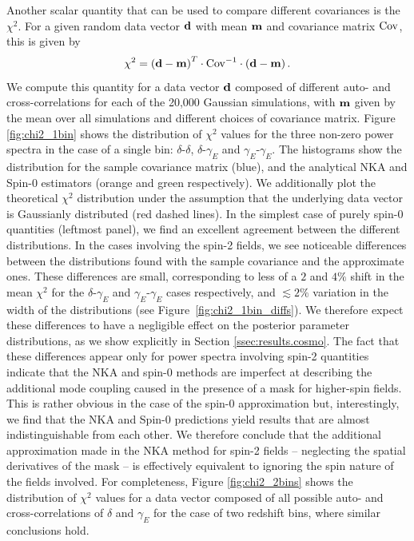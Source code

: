 \documentclass[a4paper,11pt]{article}
\begin{document}
      Another scalar quantity that can be used to compare different covariances is the $\chi^2$. For a given random data vector ${\bf d}$ with mean ${\bf m}$ and covariance matrix ${\rm Cov}$, this is given by
      \begin{equation}
        \chi^2=\left({\bf d}-{\bf m}\right)^T\cdot{\rm Cov}^{-1}\cdot\left({\bf d}-{\bf m}\right).
      \end{equation}
      We compute this quantity for a data vector ${\bf d}$ composed of different auto- and cross-correlations for each of the 20,000 Gaussian simulations, with ${\bf m}$ given by the mean over all simulations and different choices of covariance matrix. Figure \ref{fig:chi2_1bin} shows the distribution of $\chi^2$ values for the three non-zero power spectra in the case of a single bin: $\delta$-$\delta$, $\delta$-$\gamma_E$ and $\gamma_E$-$\gamma_E$. The histograms show the distribution for the sample covariance matrix (blue), and the analytical NKA and Spin-0 estimators (orange and green respectively). We additionally plot the theoretical $\chi^2$ distribution under the assumption that the underlying data vector is Gaussianly distributed (red dashed lines). In the simplest case of purely spin-0 quantities (leftmost panel), we find an excellent agreement between the different distributions. In the cases involving the spin-2 fields, we see noticeable differences between the distributions found with the sample covariance and the approximate ones.
      These differences are small, corresponding to less of a $2$ and $4\%$
      shift in the mean $\chi^2$ for the $\delta$-$\gamma_E$ and
      $\gamma_E$-$\gamma_E$ cases respectively, and $\lesssim 2\%$ variation
      in the width of the distributions (see
      Figure~\ref{fig:chi2_1bin_diffs}).  We therefore expect these
      differences to have a negligible effect on the posterior parameter
      distributions, as we show explicitly in Section
      \ref{ssec:results.cosmo}. The fact that these differences appear only
      for power spectra involving spin-2 quantities indicate that the NKA and
      spin-0 methods are imperfect at describing the additional mode coupling
      caused in the presence of a mask for higher-spin fields. This is rather
      obvious in the case of the spin-0 approximation but, interestingly, we
      find that the NKA and Spin-0 predictions yield results that are almost
      indistinguishable from each other. We therefore conclude that the
      additional approximation made in the NKA method for spin-2 fields --
      neglecting the spatial derivatives of the mask -- is effectively
      equivalent to ignoring the spin nature of the fields involved. For
      completeness, Figure \ref{fig:chi2_2bins} shows the distribution of
      $\chi^2$ values for a data vector composed of all possible auto- and
      cross-correlations of $\delta$ and $\gamma_E$ for the case of two
      redshift bins, where similar conclusions hold.
\end{document}
